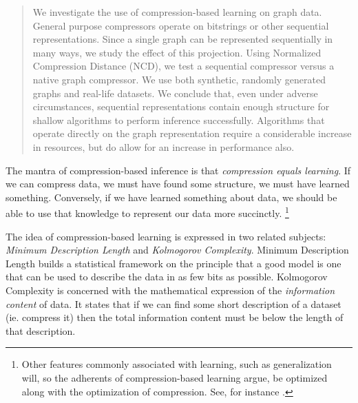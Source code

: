 \documentclass{article}
\begin{document}

\begin{abstract}
We investigate the use of compression-based learning on graph data. General purpose compressors operate on bitstrings or other sequential representations. Since a single graph can be represented sequentially in many ways, we study the effect of this projection. Using Normalized Compression Distance (NCD), we test a sequential compressor versus a native graph compressor. We use both synthetic, randomly generated graphs and real-life datasets.  We conclude that, even under adverse circumstances, sequential representations contain enough structure for shallow algorithms to perform inference successfully. Algorithms that operate directly on the graph representation require a considerable increase in resources, but do allow for an increase in performance also.
\end{abstract}

The mantra of compression-based inference is that \emph{compression equals learning}. If we can compress data, we must have found some structure, we must have learned something. Conversely, if we have learned something about data, we should be able to use that knowledge to represent our data more succinctly. \footnote{Other features commonly associated with learning, such as generalization will, so the adherents of compression-based learning argue, be optimized along with the optimization of compression. See, for instance \cite{grunwald2005tutorial,grunwald2007minimum}.}

The idea of compression-based learning is expressed in two related subjects: \emph{Minimum Description Length} and \emph{Kolmogorov Complexity}. Minimum Description Length \cite{grunwald2007minimum} builds a statistical framework on the principle that a good model is one that can be used to describe the data in as few bits as possible. Kolmogorov Complexity \cite{li1997introduction} is concerned with the mathematical expression of the \emph{information content} of  data. It states that if we can find some short description of a dataset (ie. compress it) then the total information content must be below the length of that description.
\end{document}
